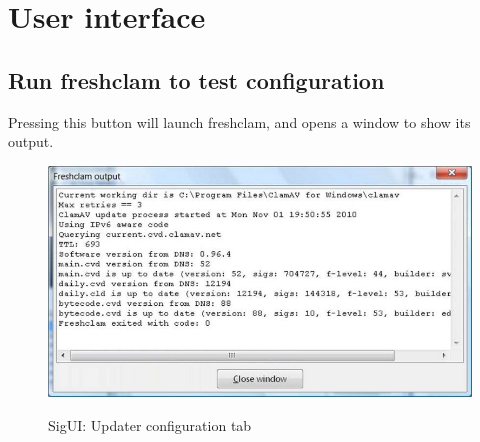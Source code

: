 \chapter{User interface}
\section{Run freshclam to test configuration}
\label{sec:runfreshclam}

Pressing this button will launch \gls{freshclam}, and opens a window to show its output.

\begin{figure}[htp]
\caption{SigUI: Updater configuration tab}
\centering
\includegraphics{sigui_run.jpg}
\label{fig:tab1}
\end{figure}

